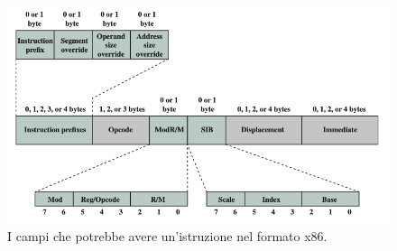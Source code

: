 \documentclass{article}
\begin{document}
\begin{figure}[h]
	\centering
	\includegraphics[scale=0.3]{immagini/formatox86}
	\caption{I campi che potrebbe avere un'istruzione nel formato x86.}
	\label{formatox86}
\end{figure}
\end{document}

